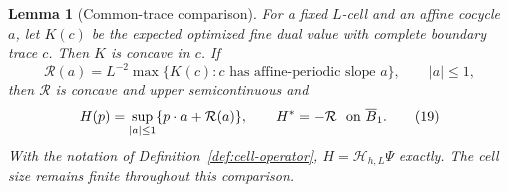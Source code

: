 \documentclass{aomart}
\newtheorem{lemma}[theorem]{Lemma}
\theoremstyle{definition}
\newcommand{\1}{\mathbf 1}
\begin{document}
\begin{lemma}[Common-trace comparison]
For a fixed $L$-cell and an affine cocycle $a$, let $K(c)$ be the
expected optimized fine dual value with complete boundary trace $c$.
Then $K$ is concave in $c$. If
\begin{equation}
\mathcal R(a)=L^{-2}\max\{K(c):c\text{ has affine-periodic slope }a\},
\qquad |a|\leq1,
\tag{18}
\end{equation}
then $\mathcal R$ is concave and upper semicontinuous and
\begin{equation}
H(p)=\sup_ {|a|\leq1}\{p\cdot a+\mathcal R(a)\},\qquad H^*=-\mathcal R
\ \hbox{ on }\overline B_ 1.
\tag{19}
\end{equation}
With the notation of Definition~\ref{def:cell-operator},
$H=\mathcal H_ {h,L}\Psi$ exactly.  The cell size remains finite throughout this comparison.

\end{lemma}
\end{document}
